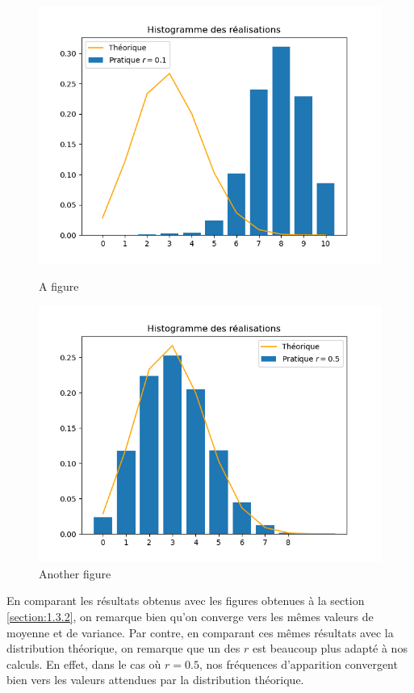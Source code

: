 \begin{figure}[!h]
  \centering
  \begin{minipage}{.5\textwidth}
    \centering
    \includegraphics[width=\linewidth]{figs/histo1.png}
    \caption{A figure}
    \label{fig:test1}
  \end{minipage}%
  \begin{minipage}{.5\textwidth}
    \centering
    \includegraphics[width=\linewidth]{figs/histo2.png}
    \caption{Another figure}
    \label{fig:test2}
  \end{minipage}
\end{figure}

En comparant les résultats obtenus avec les figures obtenues à la section \ref{section:1.3.2}, on remarque bien qu'on converge vers les mêmes valeurs de moyenne et de variance. Par contre, 
en comparant ces mêmes résultats avec la distribution théorique, on remarque que un des $r$ est beaucoup plus adapté à nos calculs. En effet, dans le cas où $r = 0.5$, nos fréquences d'apparition 
convergent bien vers les valeurs attendues par la distribution théorique.
